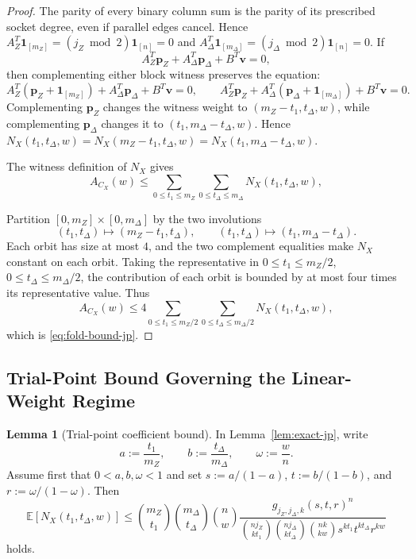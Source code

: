\documentclass[11pt]{article}
\theoremstyle{definition}
\newtheorem{lemma}[theorem]{Lemma}
\newcommand{\EE}{\mathbb E}
\newcommand{\bp}{\mathbf p}
\newcommand{\bv}{\mathbf v}
\newcommand{\ones}{\mathbf 1}
\newcommand{\CX}{C_X}
\newcommand{\NX}{N_X}
\begin{document}
\begin{proof}
The parity of every binary column sum is the parity of its prescribed
socket degree, even if parallel edges cancel.  Hence
\(A_Z^T\ones_{[m_Z]}=(j_Z\bmod2)\ones_{[n]}=0\) and
\(A_\Delta^T\ones_{[m_\Delta]}=(j_\Delta\bmod2)\ones_{[n]}=0\).
If
\[
A_Z^T \bp_Z + A_\Delta^T \bp_\Delta + B^T \bv = 0,
\]
then complementing either block witness preserves the equation:
\[
A_Z^T(\bp_Z+\ones_{[m_Z]}) + A_\Delta^T \bp_\Delta + B^T \bv = 0,
\qquad
A_Z^T \bp_Z + A_\Delta^T(\bp_\Delta+\ones_{[m_\Delta]}) + B^T \bv = 0.
\]
Complementing \(\bp_Z\) changes the witness weight to \((m_Z-t_1,t_\Delta,w)\), while complementing \(\bp_\Delta\) changes it to \((t_1,m_\Delta-t_\Delta,w)\). Hence \(\NX(t_1,t_\Delta,w)=\NX(m_Z-t_1,t_\Delta,w)=\NX(t_1,m_\Delta-t_\Delta,w)\).

The witness definition of \(\NX\) gives
\[
A_{\CX}(w)\le \sum_{0\le t_1\le m_Z}\sum_{0\le t_\Delta\le m_\Delta}\NX(t_1,t_\Delta,w),
\]

Partition \([0,m_Z]\times[0,m_\Delta]\) by the two involutions
\[
(t_1,t_\Delta)\mapsto (m_Z-t_1,t_\Delta),
\qquad
(t_1,t_\Delta)\mapsto (t_1,m_\Delta-t_\Delta).
\]
Each orbit has size at most \(4\), and the two complement equalities make \(\NX\) constant on each orbit. Taking the representative in
\(0\le t_1\le m_Z/2\), \(0\le t_\Delta\le m_\Delta/2\), the contribution of each orbit is bounded by at most four times its representative value. Thus
\[
A_{\CX}(w)
\le
4\sum_{0\le t_1\le m_Z/2}\sum_{0\le t_\Delta\le m_\Delta/2}\NX(t_1,t_\Delta,w),
\]
which is \eqref{eq:fold-bound-jp}.
\end{proof}

\subsection{Trial-Point Bound Governing the Linear-Weight Regime}

\begin{lemma}[Trial-point coefficient bound]\label{lem:trial-coeff-jp}
In Lemma~\ref{lem:exact-jp}, write
\[
a:=\frac{t_1}{m_Z},\qquad
b:=\frac{t_\Delta}{m_\Delta},\qquad
\omega:=\frac{w}{n}.
\]
Assume first that \(0<a,b,\omega<1\) and set \(s:=a/(1-a)\), \(t:=b/(1-b)\), and \(r:=\omega/(1-\omega)\). Then
\begin{equation}\label{eq:trial-coeff-bound-jp}
\EE[\NX(t_1,t_\Delta,w)]
\le
\binom{m_Z}{t_1}\binom{m_\Delta}{t_\Delta}\binom{n}{w}
\frac{g_{j_Z,j_\Delta,k}(s,t,r)^n}
{\binom{n j_Z}{kt_1}\binom{n j_\Delta}{kt_\Delta}\binom{nk}{kw}s^{kt_1}t^{kt_\Delta}r^{kw}}
\end{equation}
holds.
\end{lemma}
\end{document}
